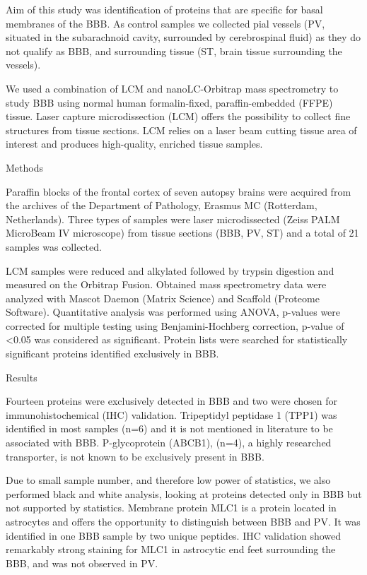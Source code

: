 Aim of this study was identification of proteins that are specific for basal membranes of the BBB. As control samples we collected pial vessels (PV, situated in the subarachnoid cavity, surrounded by cerebrospinal fluid) as they do not qualify as BBB, and surrounding tissue (ST, brain tissue surrounding the vessels).

We used a combination of LCM and nanoLC-Orbitrap mass spectrometry to study BBB using normal human formalin-fixed, paraffin-embedded (FFPE) tissue. Laser capture microdissection (LCM) offers the possibility to collect fine structures from tissue sections. LCM relies on a laser beam cutting tissue area of interest and produces high-quality, enriched tissue samples.


Methods

Paraffin blocks of the frontal cortex of seven autopsy brains were acquired from the archives of the Department of Pathology, Erasmus MC (Rotterdam, Netherlands). Three types of samples were laser microdissected (Zeiss PALM MicroBeam IV microscope) from tissue sections (BBB, PV, ST) and a total of 21 samples was collected.

LCM samples were reduced and alkylated followed by trypsin digestion and measured on the Orbitrap Fusion. Obtained mass spectrometry data were analyzed with Mascot Daemon (Matrix Science) and Scaffold (Proteome Software). Quantitative analysis was performed using ANOVA, p-values were corrected for multiple testing using Benjamini-Hochberg correction, p-value of <0.05 was considered as significant. Protein lists were searched for statistically significant proteins identified exclusively in BBB.


Results

Fourteen proteins were exclusively detected in BBB and two were chosen for immunohistochemical (IHC) validation. Tripeptidyl peptidase 1 (TPP1) was identified in most samples (n=6) and it is not mentioned in literature to be associated with BBB. P-glycoprotein (ABCB1), (n=4), a highly researched transporter, is not known to be exclusively present in BBB.

Due to small sample number, and therefore low power of statistics, we also performed black and white analysis, looking at proteins detected only in BBB but not supported by statistics. Membrane protein MLC1 is a protein located in astrocytes and offers the opportunity to distinguish between BBB and PV. It was identified in one BBB sample by two unique peptides. IHC validation showed remarkably strong staining for MLC1 in astrocytic end feet surrounding the BBB, and was not observed in PV.


